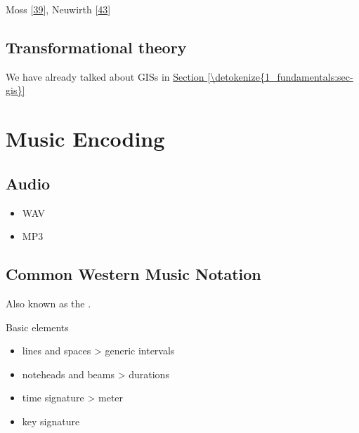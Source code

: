 \documentclass[letterpaper,10pt,english]{sphinxmanual}
\begin{document}
\sphinxAtStartPar
Moss  {[}\hyperlink{cite.8_bibliography:id54}{39}{]}, Neuwirth  {[}\hyperlink{cite.8_bibliography:id76}{43}{]}


\section{Transformational theory}
\label{\detokenize{4_harmony:transformational-theory}}
\sphinxAtStartPar
We have already talked about GISs in \hyperref[\detokenize{1_fundamentals:sec-gis}]{Section \ref{\detokenize{1_fundamentals:sec-gis}}}


\chapter{Music Encoding}
\label{\detokenize{encodings:music-encoding}}\label{\detokenize{encodings::doc}}

\section{Audio}
\label{\detokenize{encodings:audio}}\begin{itemize}
\item {} 
\sphinxAtStartPar
WAV

\item {} 
\sphinxAtStartPar
MP3

\end{itemize}


\section{Common Western Music Notation}
\label{\detokenize{encodings:common-western-music-notation}}
\sphinxAtStartPar
Also known as the .

\sphinxAtStartPar
Basic elements
\begin{itemize}
\item {} 
\sphinxAtStartPar
lines and spaces \sphinxhyphen{}\textgreater{} generic intervals

\item {} 
\sphinxAtStartPar
noteheads and beams \sphinxhyphen{}\textgreater{} durations

\item {} 
\sphinxAtStartPar
time signature \textendash{}\textgreater{} meter

\item {} 
\sphinxAtStartPar
key signature

\end{itemize}
\end{document}
